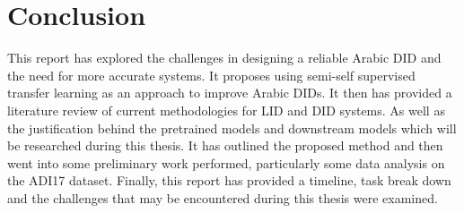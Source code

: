 \chapter{Conclusion}\label{ch:conclusion}

This report has explored the challenges in designing a reliable Arabic DID and the need for 
more accurate systems. It proposes using semi-self supervised transfer learning as an approach 
to improve Arabic DIDs. It then has provided a literature review of current methodologies for LID and DID
systems. As well as the justification behind the pretrained models and downstream models which will be 
researched during this thesis. It has outlined the proposed method and then went into some preliminary work performed, particularly some 
data analysis on the ADI17 dataset. Finally, this report has provided a timeline, task break down and the challenges that may be encountered
during this thesis were examined. 